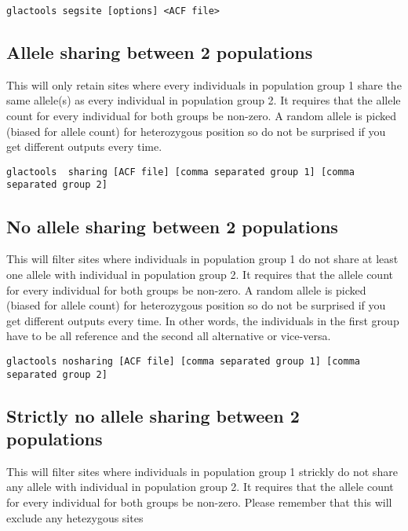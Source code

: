 \documentclass[a4paper]{article}
\begin{document}
\begin{lstlisting}
glactools segsite [options] <ACF file>
\end{lstlisting}

\subsection{Allele sharing between 2 populations}

\noindent This will only retain sites where every individuals in population group 1 share the same allele(s) as every individual in population group 2.
It requires that the allele count for every individual for both groups be non-zero.
A random allele is picked (biased for allele count) for heterozygous position so do not be surprised if you get different outputs every time.

\tiny
\begin{lstlisting}
glactools  sharing [ACF file] [comma separated group 1] [comma separated group 2]
\end{lstlisting}
\normalsize

\subsection{No allele sharing between 2 populations}

\noindent This will filter sites where individuals in population group 1 do not share at least one allele with individual in population group 2.
It requires that the allele count for every individual for both groups be non-zero.
A random allele is picked (biased for allele count) for heterozygous position so do not be surprised if you get different outputs every time.
In other words, the individuals in the first group have to be all reference and the second all alternative or vice-versa.

\tiny
\begin{lstlisting}
glactools nosharing [ACF file] [comma separated group 1] [comma separated group 2]
\end{lstlisting}
\normalsize

\subsection{Strictly no allele sharing between 2 populations}
\noindent This will filter sites where individuals in population group 1 strickly do not share any allele with individual in population group 2.
It requires that the allele count for every individual for both groups be non-zero.
Please remember that this will exclude any hetezygous sites
\end{document}
